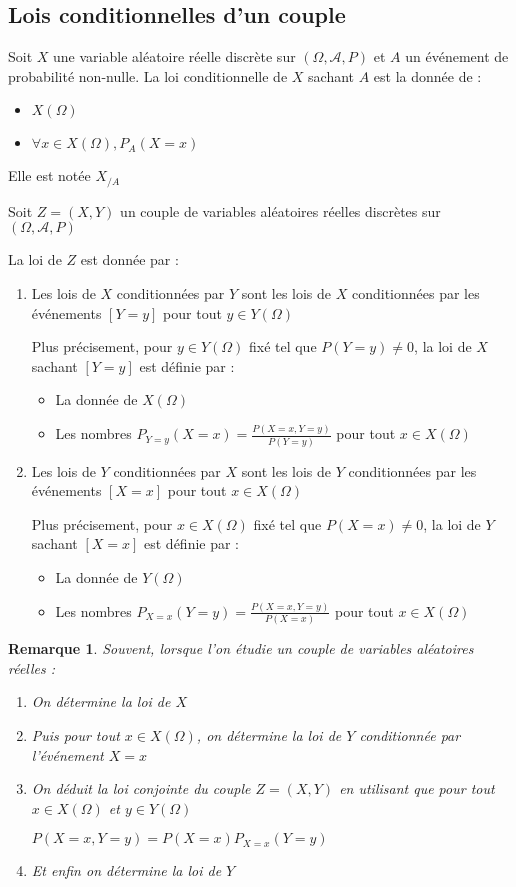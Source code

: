 \documentclass[a4paper,12pt]{book}
\newcommand{\Def}[2]{\begin{tcolorbox}[sharp corners, colback=white,colframe=blue!90!black!75, title=Définition : #1]#2\end{tcolorbox}}
\newtheorem{Rem}{Remarque}[section]
\begin{document}
\subsection{Lois conditionnelles d'un couple}
\Def{}{Soit $X$ une variable aléatoire réelle discrète sur $(\Omega,\mathcal{A}, P)$ et $A$ un événement de probabilité non-nulle. La loi conditionnelle de $X$ sachant $A$ est la donnée de :\begin{itemize}
\item $X(\Omega)$
\item $\forall x\in X(\Omega), P_A(X=x)$
\end{itemize}
Elle est notée $X_{/A}$}
\Def{}{Soit $Z=(X,Y)$ un couple de variables aléatoires réelles discrètes sur $(\Omega, \mathcal{A}, P)$
\par La loi de $Z$ est donnée par :\begin{enumerate}
\item Les lois de $X$ conditionnées par $Y$ sont les lois de $X$ conditionnées par les événements $[Y=y]$ pour tout $y\in Y(\Omega)$
\par Plus précisement, pour $y\in Y(\Omega)$ fixé tel que $P(Y=y)\neq 0$, la loi de $X$ sachant $[Y=y]$ est définie par :\begin{itemize}
    \item La donnée de $X(\Omega)$
    \item Les nombres $P_{Y=y}(X=x)=\frac{P(X=x,Y=y)}{P(Y=y)}$ pour tout $x\in X(\Omega)$
\end{itemize}
\item Les lois de $Y$ conditionnées par $X$ sont les lois de $Y$ conditionnées par les événements $[X=x]$ pour tout $x\in X(\Omega)$
\par Plus précisement, pour $x\in X(\Omega)$ fixé tel que $P(X=x)\neq 0$, la loi de $Y$ sachant $[X=x]$ est définie par :\begin{itemize}
    \item La donnée de $Y(\Omega)$
    \item Les nombres $P_{X=x}(Y=y)=\frac{P(X=x,Y=y)}{P(X=x)}$ pour tout $x\in X(\Omega)$
\end{itemize}
\end{enumerate}}
\begin{Rem}
Souvent, lorsque l'on étudie un couple de variables aléatoires réelles :\begin{enumerate}
\item On détermine la loi de $X$
\item Puis pour tout $x\in X(\Omega)$, on détermine la loi de $Y$ conditionnée par l'événement $X=x$
\item On déduit la loi conjointe du couple $Z=(X,Y)$ en utilisant que pour tout $x\in X(\Omega)$ et $y\in Y(\Omega)$ \par\begin{center}$P(X=x, Y=y)=P(X=x)P_{X=x}(Y=y)$\end{center}
\item Et enfin on détermine la loi de $Y$
\end{enumerate}
\end{Rem}
\end{document}
